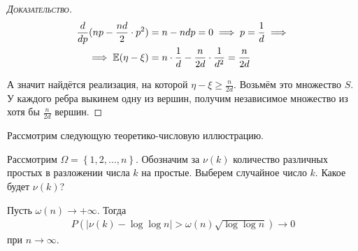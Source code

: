\documentclass[../main.tex]{subfiles}
\begin{document}
\begin{proof}[\normalfont\textsc{Доказательство}]
 \begin{align*}
	 \frac{d}{dp}(np - \frac{nd}{2} \cdot p^{2}) &= n - ndp = 0 \implies p = \frac{1}{d} \implies \\
	 \implies \mathbb E(\eta - \xi) &= n \cdot \frac 1 d - \frac{n}{2d} \cdot \frac{1}{d^2} = \frac{n}{2d} \\
 \end{align*}

 А значит найдётся реализация, на которой $ \eta - \xi \geqslant \frac{n}{2d} $. Возьмём это множество $ S $. У каждого ребра выкинем одну из вершин, получим независимое множество из хотя бы $ \frac{n}{2d} $ вершин.
\end{proof}

Рассмотрим следующую теоретико-числовую иллюстрацию.

\begin{exmpl}[]
 Рассмотрим $ \Omega = \left\{ 1,2,\ldots,n \right\} $. Обозначим за $ \nu(k) $ количество различных простых в разложении числа $ k $ на простые. Выберем случайное число $ k $. Какое будет $ \nu(k) $?
\end{exmpl}
\begin{thm}
 Пусть $ \omega(n) \to +\infty $. Тогда
 \begin{align*}
  P( \left| \nu(k) - \log\log n \right| > \omega(n) \sqrt{\log\log n}) \to 0
 \end{align*}  при $ n \to \infty $.
\end{thm}
\end{document}
